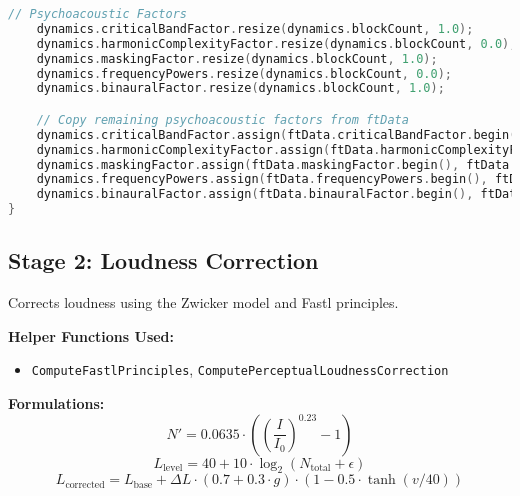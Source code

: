 \documentclass[11pt]{article}
\begin{document}
\begin{lstlisting}[language=C++]
	// Psychoacoustic Factors
	dynamics.criticalBandFactor.resize(dynamics.blockCount, 1.0);
	dynamics.harmonicComplexityFactor.resize(dynamics.blockCount, 0.0);
	dynamics.maskingFactor.resize(dynamics.blockCount, 1.0);
	dynamics.frequencyPowers.resize(dynamics.blockCount, 0.0);
	dynamics.binauralFactor.resize(dynamics.blockCount, 1.0);

	// Copy remaining psychoacoustic factors from ftData
	dynamics.criticalBandFactor.assign(ftData.criticalBandFactor.begin(), ftData.criticalBandFactor.begin() + dynamics.blockCount);
	dynamics.harmonicComplexityFactor.assign(ftData.harmonicComplexityFactor.begin(), ftData.harmonicComplexityFactor.begin() + dynamics.blockCount);
	dynamics.maskingFactor.assign(ftData.maskingFactor.begin(), ftData.maskingFactor.begin() + dynamics.blockCount);
	dynamics.frequencyPowers.assign(ftData.frequencyPowers.begin(), ftData.frequencyPowers.begin() + dynamics.blockCount);
	dynamics.binauralFactor.assign(ftData.binauralFactor.begin(), ftData.binauralFactor.begin() + dynamics.blockCount);
}
\end{lstlisting}

\subsection{Stage 2: Loudness Correction}
Corrects loudness using the Zwicker model and Fastl principles.

\textbf{Helper Functions Used:}
\begin{itemize}
  \item \texttt{ComputeFastlPrinciples}, \texttt{ComputePerceptualLoudnessCorrection}
\end{itemize}

\textbf{Formulations:}
\begin{equation}
N' = 0.0635 \cdot \left(\left(\frac{I}{I_0}\right)^{0.23} - 1\right)
\end{equation}
\begin{equation}
L_{\text{level}} = 40 + 10 \cdot \log_2(N_{\text{total}} + \epsilon)
\end{equation}
\begin{equation}
L_{\text{corrected}} = L_{\text{base}} + \Delta L \cdot (0.7 + 0.3 \cdot g) \cdot (1 - 0.5 \cdot \tanh(v/40))
\end{equation}
\end{document}

